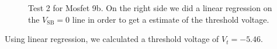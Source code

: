 \documentclass{article}
\begin{document}
\begin{figure}[H]
\centering
{}
\caption{Test 2 for Mosfet 9b. On the right side we did a linear regression on the $V_{\text{SB}} = 0$ line in order to get a estimate of the threshold voltage.}
\label{fig:9blin}
\end{figure}

Using linear regression, we calculated a threshold voltage of $V_t = -5.46$.
\end{document}
